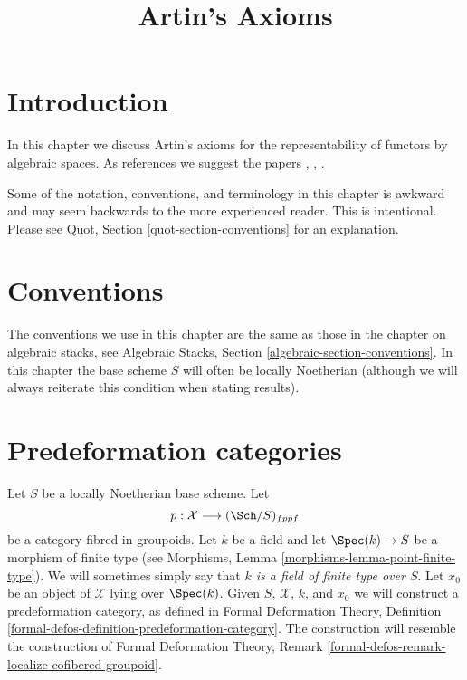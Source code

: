 

%


\title{Artin's Axioms}

\maketitle

\label{section-phantom}

\tableofcontents




\section{Introduction}
\label{section-introduction}

\noindent
In this chapter we discuss Artin's axioms for the representability of
functors by algebraic spaces. As references we suggest the papers
\cite{ArtinI}, \cite{ArtinII}, \cite{ArtinVersal}.

\medskip\noindent
Some of the notation, conventions, and terminology in this chapter is awkward
and may seem backwards to the more experienced reader. This is intentional.
Please see Quot, Section \ref{quot-section-conventions} for an
explanation.






\section{Conventions}
\label{section-conventions}

\noindent
The conventions we use in this chapter are the same as those in the
chapter on algebraic stacks, see
Algebraic Stacks, Section \ref{algebraic-section-conventions}.
In this chapter the base scheme $S$ will often be locally Noetherian
(although we will always reiterate this condition when stating
results).





\section{Predeformation categories}
\label{section-predeformation-categories}

\noindent
Let $S$ be a locally Noetherian base scheme. Let
$$
p : \mathcal{X} \longrightarrow (\Sch/S)_{fppf}
$$
be a category fibred in groupoids. Let $k$ be a field
and let $\Spec(k) \to S$ be a morphism of finite type (see
Morphisms, Lemma \ref{morphisms-lemma-point-finite-type}). We will sometimes
simply say that {\it $k$ is a field of finite type over $S$}. Let
$x_0$ be an object of $\mathcal{X}$ lying over $\Spec(k)$.
Given $S$, $\mathcal{X}$, $k$, and $x_0$ we will construct a
predeformation category, as defined in
Formal Deformation Theory,
Definition \ref{formal-defos-definition-predeformation-category}.
The construction will resemble the construction of
Formal Deformation Theory,
Remark \ref{formal-defos-remark-localize-cofibered-groupoid}.

